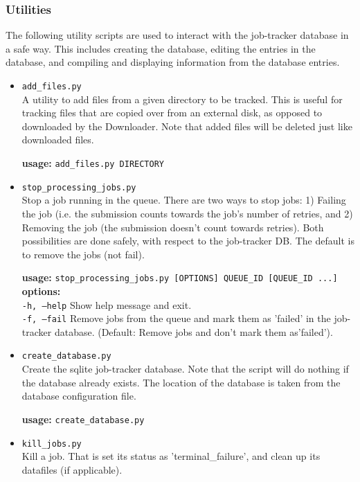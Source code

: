 \subsubsection{Utilities}
The following utility scripts are used to interact with the job-tracker database in a safe way. This includes creating the database, editing the entries in the database, and compiling and displaying information from the database entries.
\begin{itemize}
    \item \texttt{add\_files.py} \hfill \\
        A utility to add files from a given directory to be tracked. This is useful for tracking files that are copied over from an external disk, as opposed to downloaded by the Downloader. Note that added files will be deleted just like downloaded files.

        \textbf{usage:} \texttt{add\_files.py DIRECTORY} \\

    \item \texttt{stop\_processing\_jobs.py} \hfill \\
        Stop a job running in the queue. There are two ways to stop jobs: 1) Failing the job (i.e. the submission counts towards the job's number of retries, and 2) Removing the job (the submission doesn't count towards retries). Both possibilities are done safely, with respect to the job-tracker DB. The default is to remove the jobs (not fail).

        \textbf{usage:} \texttt{stop\_processing\_jobs.py [OPTIONS] QUEUE\_ID [QUEUE\_ID ...]} \\
        \textbf{options:} \\
            \texttt{-h, --help}  Show help message and exit. \\
            \texttt{-f, --fail}  Remove jobs from the queue and mark them as 'failed' in the job-tracker database. (Default: Remove jobs and don't mark them as'failed').

    \item \texttt{create\_database.py} \hfill \\
        Create the sqlite job-tracker database. Note that the script will do nothing if the database already exists. The location of the database is taken from the database configuration file.

        \textbf{usage:} \texttt{create\_database.py}

    \item \texttt{kill\_jobs.py} \hfill \\
        Kill a job. That is set its status as 'terminal\_failure', and clean up its datafiles (if applicable).


\end{itemize}
